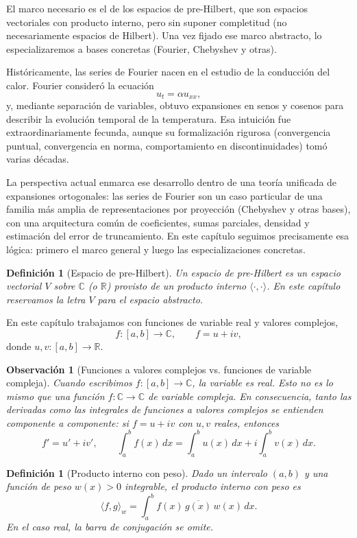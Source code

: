 \documentclass[a4paper,11pt]{report}
\newtheorem{definition}[theorem]{Definición}
\newtheorem{remark}[theorem]{Observación}
\begin{document}
El marco necesario es el de los espacios de pre-Hilbert, que son espacios vectoriales con producto interno, pero sin suponer completitud (no necesariamente espacios de Hilbert). Una vez fijado ese marco abstracto, lo especializaremos a bases concretas (Fourier, Chebyshev y otras). 

Históricamente, las series de Fourier nacen en el estudio de la conducción del calor. Fourier consideró la ecuación
\[
u_t = \alpha u_{xx},
\]
y, mediante separación de variables, obtuvo expansiones en senos y cosenos para describir la evolución temporal de la temperatura. Esa intuición fue extraordinariamente fecunda, aunque su formalización rigurosa (convergencia puntual, convergencia en norma, comportamiento en discontinuidades) tomó varias décadas.

La perspectiva actual enmarca ese desarrollo dentro de una teoría unificada de expansiones ortogonales: las series de Fourier son un caso particular de una familia más amplia de representaciones por proyección (Chebyshev y otras bases), con una arquitectura común de coeficientes, sumas parciales, densidad y estimación del error de truncamiento. En este capítulo seguimos precisamente esa lógica: primero el marco general y luego las especializaciones concretas.

\begin{definition}[Espacio de pre-Hilbert]
Un espacio de pre-Hilbert es un espacio vectorial $V$ sobre $\mathbb C$ (o $\mathbb R$) provisto de un producto interno $\langle\cdot,\cdot\rangle$. En este capítulo reservamos la letra $V$ para el espacio abstracto.
\end{definition}

En este capítulo trabajamos con funciones de variable real y valores complejos,
\[
f:[a,b]\to\mathbb{C},\qquad f=u+iv,
\]
donde $u,v:[a,b]\to\mathbb{R}$.

\begin{remark}[Funciones a valores complejos vs. funciones de variable compleja]
Cuando escribimos $f:[a,b]\to\mathbb{C}$, la variable es real. Esto no es lo mismo que una función $f:\mathbb{C}\to\mathbb{C}$ de variable compleja. En consecuencia, tanto las derivadas como las integrales de funciones a valores complejos se entienden componente a componente: si $f=u+iv$ con $u,v$ reales, entonces
\[
f'=u'+iv',
\qquad
\int_a^b f(x)\,dx=\int_a^b u(x)\,dx+i\int_a^b v(x)\,dx.
\]
\end{remark}

\begin{definition}[Producto interno con peso]
Dado un intervalo $(a,b)$ y una función de peso $w(x) > 0$ integrable, el producto interno con peso es
\[
\langle f,g\rangle_w = \int_a^b f(x)\,\overline{g(x)}\,w(x)\,dx.
\]
En el caso real, la barra de conjugación se omite.
\end{definition}
\end{document}
